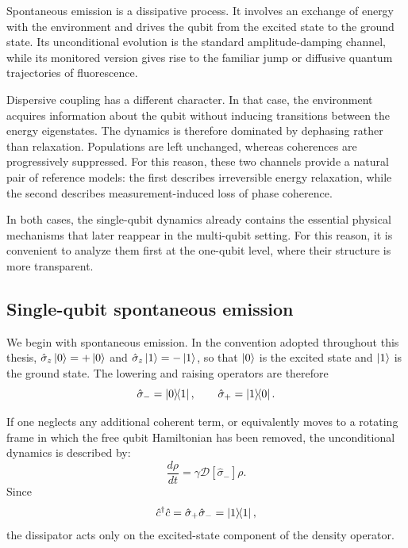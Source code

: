 Spontaneous emission is a dissipative process. It involves an exchange of energy with the environment and drives the qubit from the excited state to the ground state. Its unconditional evolution is the standard amplitude-damping channel, while its monitored version gives rise to the familiar jump or diffusive quantum trajectories of fluorescence.

Dispersive coupling has a different character. In that case, the environment acquires information about the qubit without inducing transitions between the energy eigenstates. The dynamics is therefore dominated by dephasing rather than relaxation. Populations are left unchanged, whereas coherences are progressively suppressed. For this reason, these two channels provide a natural pair of reference models: the first describes irreversible energy relaxation, while the second describes measurement-induced loss of phase coherence.

In both cases, the single-qubit dynamics already contains the essential physical mechanisms that later reappear in the multi-qubit setting. For this reason, it is convenient to analyze them first at the one-qubit level, where their structure is more transparent.

\subsection{Single-qubit spontaneous emission}
\label{subsec:single_qubit_spontaneous_emission}

We begin with spontaneous emission. In the convention adopted throughout this thesis, \(\hat \sigma_z\ket{0}=+\ket{0}\) and \(\hat \sigma_z\ket{1}=-\ket{1}\), so that \(\ket{0}\) is the excited state and \(\ket{1}\) is the ground state. The lowering and raising operators are therefore
\begin{equation}
	\hat \sigma_- = \dyad{0}{1},
	\qquad
	\hat \sigma_+ = \dyad{1}{0}.
	\label{eq:single_qubit_spontaneous_emission_sigma_pm}
\end{equation}

If one neglects any additional coherent term, or equivalently moves to a rotating frame in which the free qubit Hamiltonian has been removed, the unconditional dynamics is described by:
\begin{equation}
\frac{d\rho}{dt}
=
\gamma \mathcal{D}[\hat \sigma_-]\rho.
\label{eq:single_qubit_spontaneous_emission_master_equation}
\end{equation}
Since
\begin{equation}
	\hat c^{\dagger} \hat c = \hat \sigma_+ \hat \sigma_- = \dyad{1}{1},
	\label{eq:single_qubit_spontaneous_emission_projector_excited}
\end{equation}
the dissipator acts only on the excited-state component of the density operator.

